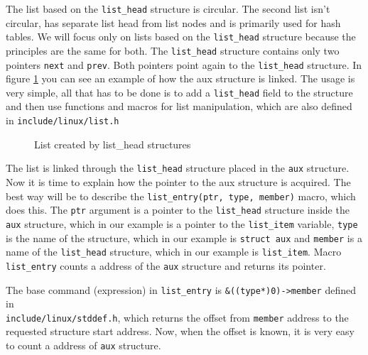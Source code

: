 The list based on the \texttt{list\_head} structure is circular. The second list isn't circular,
has separate list head from list nodes and is primarily used for hash tables. 
We will focus only on lists based on the \texttt{list\_head} structure because the
principles are the same for both. The \texttt{list\_head} structure contains only two
pointers \texttt{next} and \texttt{prev}. Both pointers point again to the
\texttt{list\_head} structure. In figure \ref{fig:vfs_list} you can see an example of how
the aux structure is linked. The usage is very simple, all that has to be done is to
add a \texttt{list\_head} field to the structure and then use functions and macros for
list manipulation, which are also defined in \texttt{include/linux/list.h}

\begin{figure}[h]
	\begin{center}
		
	\end{center}
	\caption{List created by list\_head structures}
	\label{fig:vfs_list}
\end{figure}

The list is linked through the \texttt{list\_head} structure placed in the \texttt{aux}
structure. Now it is time to explain how the pointer to the aux structure is acquired.
The best way will be to describe the \texttt{list\_entry(ptr, type, member)} macro, which
does this. The \texttt{ptr} argument is a pointer to the \texttt{list\_head}
structure inside the \texttt{aux} structure, which in our example is a pointer to the
\texttt{list\_item} variable, \texttt{type} is the name of the structure, which in our example
is \texttt{struct aux} and \texttt{member} is a name of the \texttt{list\_head}
structure, which in our example is \texttt{list\_item}. Macro \texttt{list\_entry}
counts a address of the \texttt{aux} structure and returns its pointer. 

The base command (expression) in \texttt{list\_entry} is \texttt{\&((type*)0)->member}
defined in \\ \texttt{include/linux/stddef.h}, which returns the offset from
\texttt{member} address to the requested structure start address. Now, when the offset
is known, it is very easy to count a address of \texttt{aux} structure.

 
